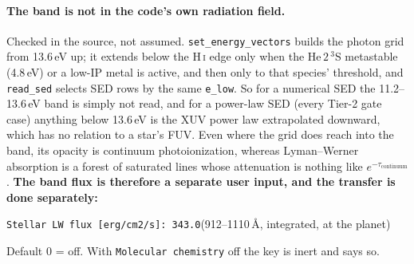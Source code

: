 \documentclass[english,a4paper]{my_memo}
\begin{document}
\paragraph{The band is not in the code's own radiation field.} Checked in the
source, not assumed. \texttt{set\_energy\_vectors} builds the photon grid from
13.6\,eV up; it extends below the H\,\textsc{i} edge only when the He\,$2\,^3$S
metastable (4.8\,eV) or a low-IP metal is active, and then only to that species'
threshold, and \texttt{read\_sed} selects SED rows by the same \texttt{e\_low}. So
for a numerical SED the 11.2--13.6\,eV band is simply not read, and for a
power-law SED (every Tier-2 gate case) anything below 13.6\,eV is the XUV power
law extrapolated downward, which has no relation to a star's FUV. Even where the
grid does reach into the band, its opacity is continuum photoionization, whereas
Lyman--Werner absorption is a forest of saturated lines whose attenuation is
nothing like $e^{-\tau_\mathrm{continuum}}$. \textbf{The band flux is therefore a
separate user input, and the transfer is done separately:}
\begin{center}
\texttt{Stellar LW flux [erg/cm2/s]: 343.0}\quad\small(912--1110\,\AA, integrated, at the planet)
\end{center}
Default 0 = off. With \texttt{Molecular chemistry} off the key is inert and says so.
\end{document}
